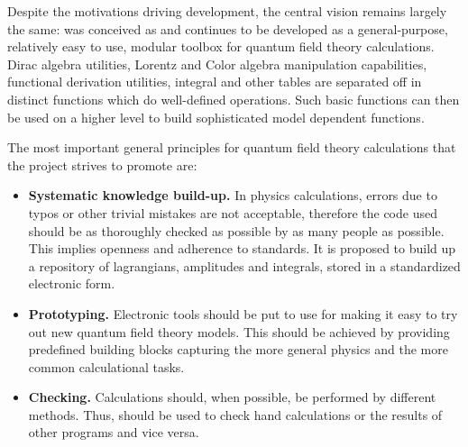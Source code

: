 Despite the motivations driving development, the central vision remains largely the same: 
\fc was conceived as and continues to be developed as a general-purpose, relatively easy to use,
modular toolbox for quantum field theory calculations. 
Dirac algebra utilities, Lorentz and Color algebra manipulation capabilities, 
functional derivation utilities, integral and other tables are separated off in distinct
functions which do well-defined operations.
Such basic functions can then be used on a higher level to build sophisticated model dependent
functions.

The most important general principles for quantum field theory calculations that the \fc project
strives to promote are:

\begin{itemize}

%

\item{{\bf Systematic knowledge build-up.} In physics calculations, errors due to typos or
other trivial mistakes are not acceptable, therefore the code used should be as thoroughly
checked as possible by as many people as possible. This implies openness and adherence to
standards. It is proposed to build up a repository of lagrangians, amplitudes and integrals,
stored in a standardized electronic form.}


\item{{\bf Prototyping.} Electronic tools should be put to use for making it easy to
try out new quantum field theory models. This should be achieved by providing predefined
building blocks capturing the more general physics and the more common calculational tasks.}

\item{{\bf Checking.} Calculations should, when possible, be performed by different methods.
Thus, \fc should be used to check hand calculations or the results of other programs and
vice versa.}

\end{itemize}

